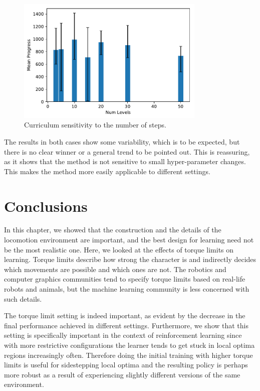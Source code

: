 \begin{figure}
    \centering
    \includegraphics[width=90mm]{img/TorqueLimit_Curr_Steps.pdf}
    \caption{Curriculum sensitivity to the number of steps.}
    \label{fig:torque_limit_hp_steps}
\end{figure}

The results in both cases show some variability, which is to be expected, but there is no clear winner or a general trend to be pointed out. This is reassuring, as it shows that the method is not sensitive to small hyper-parameter changes. This makes the method more easily applicable to different settings.



\section{Conclusions}
In this chapter, we showed that the construction and the details of the locomotion environment are important, and the best design for learning need not be the most realistic one. Here, we looked at the effects of torque limits on learning. Torque limits describe how strong the character is and indirectly decides which movements are possible and which ones are not. The robotics and computer graphics communities tend to specify torque limits based on real-life robots and animals, but the machine learning community is less concerned with such details.

The torque limit setting is indeed important, as evident by the decrease in the final performance achieved in different settings. Furthermore, we show that this setting is specifically important in the context of reinforcement learning since with more restrictive configurations the learner tends to get stuck in local optima regions increasingly often. Therefore doing the initial training with higher torque limits is useful for sidestepping local optima and the resulting policy is perhaps more robust as a result of experiencing slightly different versions of the same environment.

